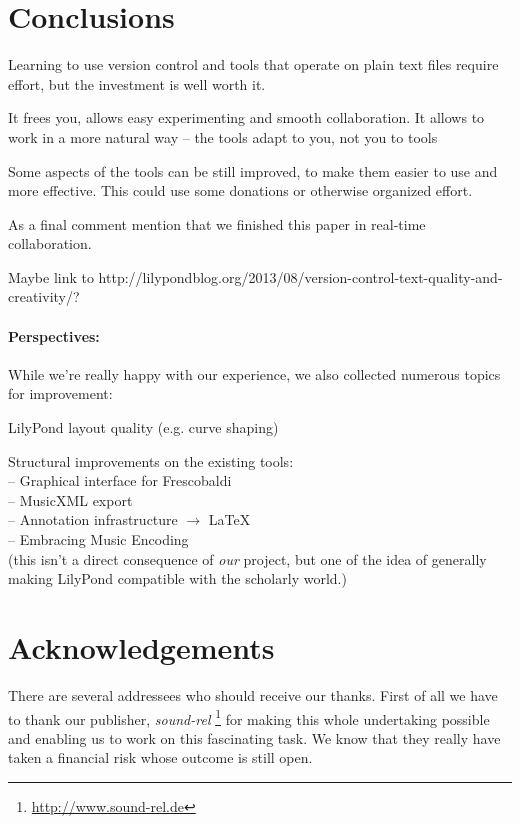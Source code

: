 \documentclass[11pt,a4paper]{article}
\begin{document}
\section{Conclusions}\label{sec:conclusions}

Learning to use version control and tools that operate on plain text files require
effort, but the investment is well worth it.  

It frees you, allows easy experimenting and smooth collaboration.  It allows to work in a more natural way -- the tools adapt to you, not you to tools

Some aspects of the tools can be still improved, to make them easier to use and more
effective.  This could use some donations or otherwise organized effort.

As a final comment mention that we finished this paper in real-time collaboration.

Maybe link to http://lilypondblog.org/2013/08/version-control-text-quality-and-creativity/?

\paragraph{Perspectives:}
While we're really happy with our experience, we also collected numerous topics for
improvement:
\begin{itemize*}
\item LilyPond layout quality (e.g. curve shaping)
\item Structural improvements on the existing tools:\\
-- Graphical interface for Frescobaldi\\
-- MusicXML export\\
-- Annotation infrastructure $\rightarrow$ \LaTeX\\
-- Embracing Music Encoding\\
(this isn't a direct consequence of \emph{our} project, but one of the idea of
generally making LilyPond compatible with the scholarly world.)

\end{itemize*}

\section{Acknowledgements}

There are several addressees who should receive our thanks. First of all we have to thank our publisher, \emph{sound-rel}%
\footnote{\url{http://www.sound-rel.de}} for making this whole undertaking possible and
enabling us to work on this fascinating task. We know that they really have taken a financial
risk whose outcome is still open.
\end{document}
